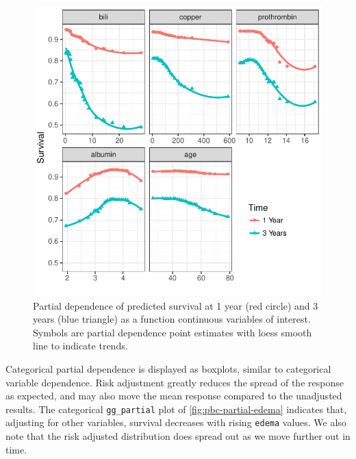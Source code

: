 \documentclass[article]{jss}
\begin{document}
\begin{Schunk}
\begin{figure}[!htb]

{\centering \includegraphics{rfs-pbc-partial-panel-1} 

}

\caption[Partial dependence of predicted survival at 1 year (red circle) and 3 years (blue triangle) as a function continuous variables of interest]{Partial dependence of predicted survival at 1 year (red circle) and 3 years (blue triangle) as a function continuous variables of interest. Symbols are partial dependence point estimates with loess smooth line to indicate trends.}\label{fig:pbc-partial-panel}
\end{figure}
\end{Schunk}

Categorical partial dependence is displayed as boxplots, similar to
categorical variable dependence. Risk adjustment greatly reduces the
spread of the response as expected, and may also move the mean response
compared to the unadjusted results. The categorical \texttt{gg\_partial}
plot of \autoref{fig:pbc-partial-edema} indicates that, adjusting for
other variables, survival decreases with rising \texttt{edema} values.
We also note that the risk adjusted distribution does spread out as we
move further out in time.
\end{document}
